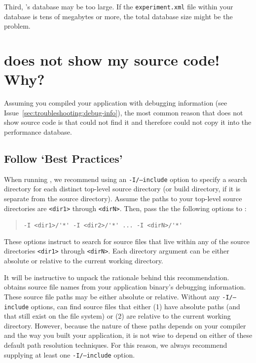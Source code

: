 \documentclass[11pt,letterpaper]{report}
\begin{document}
Third, \HPCToolkit{}'s database may be too large.
If the \texttt{experiment.xml} file within your database is tens of megabytes or more, the total database size might be the problem.



\section{\hpcviewer{} does not show my source code! Why?}


Assuming you compiled your application with debugging information (see Issue~\ref{sec:troubleshooting:debug-info}), the most common reason that \hpcviewer{} does not show source code is that \hpcprofAll{} could not find it and therefore could not copy it into the \HPCToolkit{} performance database.



\subsection{Follow `Best Practices'}

When running \hpcprofAll{}, we recommend using an \texttt{-I/--include} option to specify a search directory for each distinct top-level source directory (or build directory, if it is separate from the source directory).
Assume the paths to your top-level source directories are \texttt{<dir1>} through \texttt{<dirN>}.
Then, pass the the following options to \hpcprofAll{}:
\begin{quote}
  \verb|-I <dir1>/'*' -I <dir2>/'*' ... -I <dirN>/'*'|
\end{quote}
These options instruct \hpcprofAll{} to search for source files that live within any of the source directories \texttt{<dir1>} through \texttt{<dirN>}.
Each directory argument can be either absolute or relative to the current working directory.

It will be instructive to unpack the rationale behind this recommendation.
\hpcprofAll{} obtains source file names from your application binary's debugging information.
These source file paths may be either absolute or relative.
Without any \texttt{-I/--include} options, \hpcprofAll{} can find source files that either (1) have absolute paths (and that still exist on the file system) or (2) are relative to the current working directory.
However, because the nature of these paths depends on your compiler and the way you built your application, it is not wise to depend on either of these default path resolution techniques.
For this reason, we always recommend supplying at least one \texttt{-I/--include} option.
\end{document}
